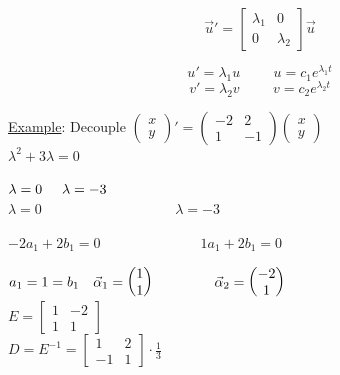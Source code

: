 \documentclass[12pt]{article}
\numberwithin{equation}{subsection}
\newcommand{\inda}{\hspace{.5cm}}
\newcommand{\indb}{\hspace{1cm}}
\newcommand{\indc}{\hspace{1.5cm}}
\newcommand{\indf}{\hspace{3cm}}
\newcommand{\indh}{\hspace{4cm}}
\newcommand{\exa}{\noindent \underline{Example}: \hspace{1cm}}
\begin{document}
\begin{equation}
\vec{u}'=\begin{bmatrix}
\lambda_1 & 0 \\
0 & \lambda_2
\end{bmatrix} \vec{u}
\end{equation}

\begin{equation}
u'=\lambda_1 u \indb u=c_1e^{\lambda_1 t}
\end{equation}
\begin{equation}
v'=\lambda_2 v \indb v=c_2e^{\lambda_2 t}
\end{equation}

\newpage

\exa Decouple $\begin{pmatrix}
x \\ y
\end{pmatrix}'=\begin{pmatrix}
-2 & 2 \\ 1 & -1
\end{pmatrix}\begin{pmatrix}
x \\ y
\end{pmatrix}$\\

\indb $\lambda^2 +3\lambda =0$

\indb $\lambda =0 \inda \lambda=-3$\\

\indc $\lambda=0 \indh \lambda=-3$

\indb $-2a_1+2b_1=0 \indf 1a_1+2b_1=0$

\indb $a_1=1=b_1\ \ \ \vec{\alpha}_1=\begin{pmatrix}
1 \\ 1
\end{pmatrix} \indc \vec{\alpha}_2=\begin{pmatrix}
-2 \\ 1
\end{pmatrix}$\\

\indf $E=\begin{bmatrix}
1 & -2 \\ 1 & 1
\end{bmatrix}  $\\

\indf $D=E^{-1}=\begin{bmatrix}
1 & 2 \\ -1 & 1
\end{bmatrix}\cdot \frac{1}{3}  $\\
\end{document}
